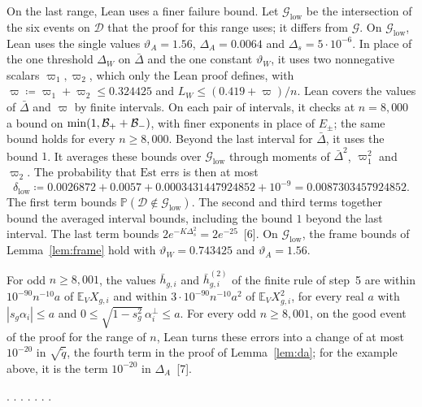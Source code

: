 \documentclass[10pt]{article}
\newcommand{\leanmark}[1]{{\relscale{0.78}\color{gray}[#1]}}
\newenvironment{leanitems}{\par\smallskip\relscale{0.78}\color{gray}\hypersetup{urlcolor=gray}\raggedright%
  \begin{list}{}{\setlength{\leftmargin}{2em}\setlength{\labelwidth}{1.6em}%
  \setlength{\labelsep}{0.4em}\setlength{\itemsep}{0pt}\setlength{\topsep}{0pt}%
  \setlength{\parsep}{0pt}}}{\end{list}\par\medskip}
\newcommand{\Dd}{\mathcal{D}}\newcommand{\Ee}{\mathcal{E}}
\newcommand{\Gg}{\mathcal{G}}\newcommand{\Hh}{\mathcal{H}}
\newcommand{\Est}{\mathrm{Est}}
\newcommand{\EE}{\mathbb{E}}
\newcommand{\PP}{\mathbb{P}}
\begin{document}
On the last range, Lean uses a finer failure bound. Let $\Gg_{\mathrm{low}}$
be the intersection of the six events on $\Dd$ that the proof
for this range uses; it differs from $\Gg$. On $\Gg_{\mathrm{low}}$, Lean uses the single values
$\vartheta_A=1.56$, $\Delta_A=0.0064$ and $\Delta_s=5\cdot10^{-6}$. In place
of the one threshold $\Delta_W$ on $\bar\Delta$ and the one constant
$\vartheta_W$, it uses two nonnegative scalars $\varpi_1,\varpi_2$, which only the Lean
proof defines, with $\varpi\coloneqq \varpi_1+\varpi_2\le0.324425$ and $L_W\le(0.419+\varpi)/n$. Lean
covers the values of $\bar\Delta$ and $\varpi$ by finite intervals. On each pair
of intervals, it checks at $n=8{,}000$ a bound on $\min(1,\mathcal{B}_++\mathcal{B}_-)$, with
finer exponents in place of $E_\pm$; the same bound holds for every
$n\ge8{,}000$. Beyond the last interval for $\bar\Delta$, it uses the bound $1$.
It averages these bounds over $\Gg_{\mathrm{low}}$ through moments of
$\bar\Delta^2$, $\varpi_1^2$ and $\varpi_2$. The probability that $\Est$ errs is then at
most
\[\delta_{\mathrm{low}}\coloneqq0.0026872+0.0057+0.0003431447924852+10^{-9}
=0.0087303457924852.\]
The first term bounds $\PP(\Dd\notin\Gg_{\mathrm{low}})$. The second and
third terms together bound the averaged interval bounds, including the bound
$1$ beyond the last interval. The last term bounds $2e^{-K\Delta_s^2}=2e^{-25}$~\leanmark{6}. On $\Gg_{\mathrm{low}}$, the frame bounds of
Lemma~\ref{lem:frame} hold with $\vartheta_W=0.743425$ and $\vartheta_A=1.56$.

For odd $n\ge8{,}001$, the values $\bar h_{g,i}$ and $\bar h^{(2)}_{g,i}$ of the
finite rule of step~5 are within $10^{-90}n^{-10}a$ of $\EE_VX_{g,i}$ and within
$3\cdot10^{-90}n^{-10}a^2$ of $\EE_VX_{g,i}^2$, for every real $a$ with
$|s_g\alpha_i|\le a$ and $0\le\sqrt{1-s_g^2}\,\alpha^\perp_i\le a$. For every odd $n\ge8{,}001$, on the good event of the proof for the range of
$n$, Lean turns these errors into a change of at most $10^{-20}$ in
$\sqrt{\tilde q}$, the fourth term in the proof of Lemma~\ref{lem:da}; for the
example above, it is the term $10^{-20}$ in $\Delta_A$~\leanmark{7}.
\begin{leanitems}
\leanitem*[1]{\leanstepG}.
\leanitem*[2]{\leanstepH}.
\leanitem*[3]{\leanstepI}.
\leanitem*[4]{\leanstepJ}.
.
.
.
\end{leanitems}
\end{document}
